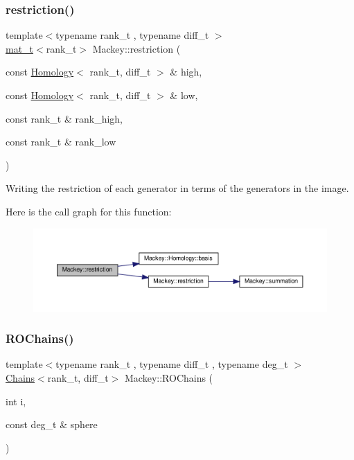 \subsubsection{\texorpdfstring{restriction()}{restriction()}\hspace{0.1cm}{\footnotesize\ttfamily [2/2]}}
{\footnotesize\ttfamily template$<$typename rank\+\_\+t , typename diff\+\_\+t $>$ \\
\hyperlink{namespaceMackey_a035386035757dade630f685e508e5cf9}{mat\+\_\+t}$<$rank\+\_\+t$>$ Mackey\+::restriction (\begin{DoxyParamCaption}\item[{const \hyperlink{classMackey_1_1Homology}{Homology}$<$ rank\+\_\+t, diff\+\_\+t $>$ \&}]{high,  }\item[{const \hyperlink{classMackey_1_1Homology}{Homology}$<$ rank\+\_\+t, diff\+\_\+t $>$ \&}]{low,  }\item[{const rank\+\_\+t \&}]{rank\+\_\+high,  }\item[{const rank\+\_\+t \&}]{rank\+\_\+low }\end{DoxyParamCaption})}



Writing the restriction of each generator in terms of the generators in the image. 

Here is the call graph for this function\+:\nopagebreak
\begin{figure}[H]
\begin{center}
\leavevmode
\includegraphics[width=350pt]{namespaceMackey_a6818760aa9590810daace862e4c71f04_cgraph}
\end{center}
\end{figure}
\mbox{\label{namespaceMackey_a08fd3743ffb625fceca454da757dfa5d}} 
\subsubsection{\texorpdfstring{R\+O\+Chains()}{ROChains()}\hspace{0.1cm}{\footnotesize\ttfamily [1/2]}}
{\footnotesize\ttfamily template$<$typename rank\+\_\+t , typename diff\+\_\+t , typename deg\+\_\+t $>$ \\
\hyperlink{classMackey_1_1Chains}{Chains}$<$rank\+\_\+t, diff\+\_\+t$>$ Mackey\+::\+R\+O\+Chains (\begin{DoxyParamCaption}\item[{int}]{i,  }\item[{const deg\+\_\+t \&}]{sphere }\end{DoxyParamCaption})}



